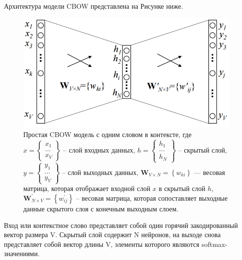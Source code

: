 \documentclass[12pt,a4paper, oneside]{extreport}
\begin{document}
Архитектура  модели CBOW представлена на Рисунке ниже.


\begin{figure}[H]
	\centering
	\includegraphics[width=0.75\linewidth]{screenshot002}
	\caption{Простая CBOW модель с одним словом в контексте, где
		\newline		 $x = \left\{ 	\begin{array}{l}
				x_{1} \\
				\dots \\
				x_{V}
			\end{array}
		\right\}
$ -- слой входных данных, 
	\newline		 $h = \left\{ 	\begin{array}{l}
		h_{1} \\
		\dots \\
		h_{N}
	\end{array}
	\right\}
$ -- скрытый слой,
	\newline		 $y = \left\{ 	\begin{array}{l}
		y_{1} \\
		\dots \\
		y_{V}
	\end{array}
	\right\}
$ --  слой выходных данных, 
	\newline
	$\mathbf{W}_{V \times N}=\left\{w_{k i}\right\}$ — весовая матрица, которая отображает входной слой $x$ в скрытый слой $h$,
	\newline
	$\mathbf{W}_{N \times V}^{\prime}=\left\{w_{i j}^{\prime}\right\}$ -- 
	весовая матрица, которая сопоставляет выходные данные скрытого слоя с конечным выходным слоем.
 }
	\label{fig:screenshot001}
\end{figure}



Вход или контекстное слово представляет собой один горячий закодированный вектор размера V. Скрытый слой содержит N нейронов, на выходе снова представляет собой вектор длины V, элементы которого являются softmax-значениями.
\end{document}
